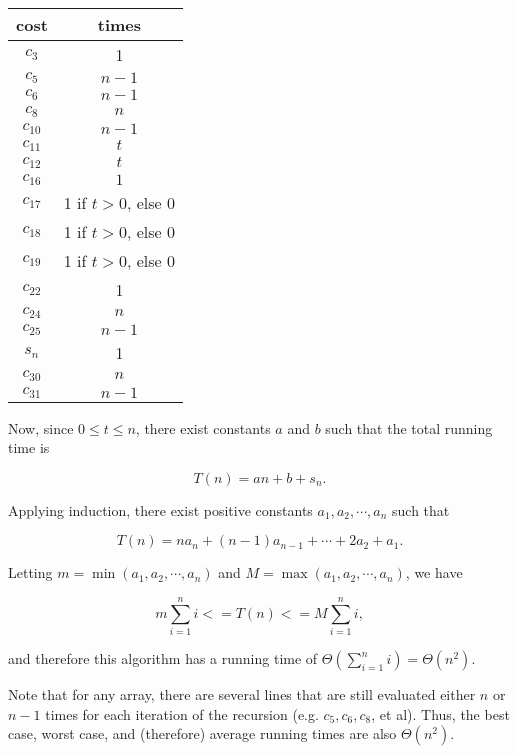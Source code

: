 \documentclass{article}
\begin{document}
\bigskip

\begin{tabular}{|c|c|}
\hline 
cost & times \\ 
\hline 
$c_3$ & 1 \\ 
\hline 
$c_5$ & $n-1$ \\ 
\hline 
$c_6$ & $n-1$ \\ 
\hline 
$c_8$ & $n$ \\ 
\hline 
$c_{10}$ & $n-1$ \\ 
\hline 
$c_{11}$ & $t$ \\ 
\hline 
$c_{12}$ & $t$ \\ 
\hline 
$c_{16}$ & $1$ \\ 
\hline 
$c_{17}$ & 1 if $t>0$, else 0 \\
\hline
$c_{18}$ & 1 if $t>0$, else 0 \\
\hline
$c_{19}$ & 1 if $t>0$, else 0 \\
\hline
$c_{22}$ & 1 \\
\hline
$c_{24}$ & $n$ \\
\hline
$c_{25}$ & $n-1$ \\
\hline
$s_n$ & 1 \\
\hline
$c_{30}$ & $n$ \\
\hline
$c_{31}$ & $n-1$ \\
\hline
\end{tabular} 

\bigskip
\bigskip

Now, since $0 \leq t \leq n$, there exist constants $a$ and $b$ such that the total running time is

\[
	T(n) = an + b + s_n.
\]

\noindent Applying induction, there exist positive constants $a_1, a_2, \cdots, a_n$ such that 

\[
	T(n) = n a_n + (n-1) a_{n-1} + \cdots + 2 a_2 + a_1.
\]

Letting $m = \min(a_1,a_2,\cdots,a_n)$ and $M = \max(a_1,a_2,\cdots,a_n)$, we have

\[
	m \sum\limits_{i=1}^n i <= T(n) <= M \sum\limits_{i=1}^n i,
\]

\noindent and therefore this algorithm has a running time of $\Theta\left(\sum\limits_{i=1}^n i\right) = \Theta(n^2)$.

Note that for any array, there are several lines that are still evaluated either $n$ or $n-1$ times for each iteration of the recursion (e.g. $c_5, c_6, c_8$, et al). Thus, the best case, worst case, and (therefore) average running times are also $\Theta(n^2)$.
\end{document}
